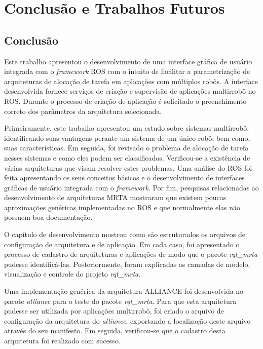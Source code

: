\chapter[Conclusão e Trabalhos Futuros]{Conclusão e Trabalhos Futuros} \label{cap:conclusao}

    \section{Conclusão}
        Este trabalho apresentou o desenvolvimento de uma interface gráfica de usuário integrada com o \textit{framework} ROS com o intuito de facilitar a parametrização de arquiteturas de alocação de tarefa em aplicações com múltiplos robôs. A interface desenvolvida fornece serviços de criação e supervisão de aplicações multirrobô no ROS. Durante o processo de criação de aplicação é solicitado o preenchimento correto dos parâmetros da arquitetura selecionada. 
        
        Primeiramente, este trabalho apresentou um estudo sobre sistemas multirrobô, identificando suas vantagens perante um sistema de um único robô, bem como, suas características. Em seguida, foi revisado o problema de alocação de tarefa nesses sistemas e como eles podem ser classificados. Verificou-se a existência de várias arquiteturas que visam resolver estes problemas. Uma análise do ROS foi feita apresentando os seus conceitos básicos e o desenvolvimento de interfaces gráficas de usuário integrada com o \textit{framework}. Por fim, pesquisas relacionadas ao desenvolvimento de arquiteturas MRTA mostraram que existem poucas aproximações genéricas implementadas no ROS e que normalmente elas não possuem boa documentação.
        
        O capítulo de desenvolvimento mostrou como são estruturados os arquivos de configuração de arquitetura e de  aplicação. Em cada caso, foi apresentado o processo de cadastro de arquiteturas e aplicações de modo que o pacote \textit{rqt\_mrta} pudesse identificá-las. Posteriormente, foram explicadas as camadas de modelo, visualização e controle do projeto \textit{rqt\_mrta}. 
    
        Uma implementação genérica da arquitetura ALLIANCE foi desenvolvida no pacote \textit{alliance} para o teste do pacote \textit{rqt\_mrta}. Para que esta arquitetura pudesse ser utilizada por aplicações multirrobô, foi criado o arquivo de configuração da arquitetura do \textit{alliance}, exportando a localização deste arquivo através do seu manifesto. Em seguida, verificou-se que o cadastro desta arquitetura foi realizado com sucesso.
        
